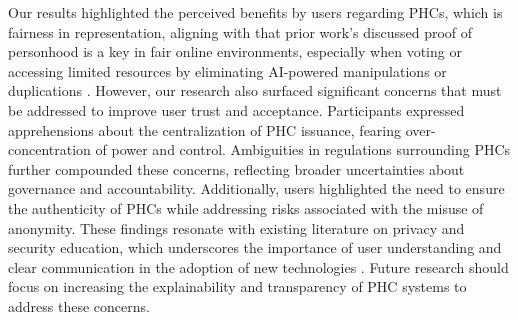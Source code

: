 Our results highlighted the perceived benefits by users regarding PHCs, which is fairness in representation, aligning with that prior work's discussed proof of personhood is a key in fair online environments, especially when voting or accessing limited resources by eliminating AI-powered manipulations or duplications
\cite{de2024personhood}. 
However, our research also surfaced significant concerns that must be addressed to improve user trust and acceptance. Participants expressed apprehensions about the centralization of PHC issuance, fearing over-concentration of power and control. Ambiguities in regulations surrounding PHCs further compounded these concerns, reflecting broader uncertainties about governance and accountability. Additionally, users highlighted the need to ensure the authenticity of PHCs while addressing risks associated with the misuse of anonymity. These findings resonate with existing literature on privacy and security education, which underscores the importance of user understanding and clear communication in the adoption of new technologies \cite{acquisti2015privacy}. Future research should focus on increasing the explainability and transparency of PHC systems to address these concerns. 







